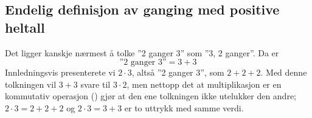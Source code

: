 \subsection*{Endelig definisjon av ganging med positive heltall}
Det ligger kanskje nærmest å tolke ''2 ganger 3'' som ''3, 2 ganger''. Da er
\[ \text{''2 ganger 3''}=3+3 \] 
Innledningsvis presenterete vi $ {2\cdot3} $, altså ''2 ganger 3'', som $ {2+2+2} $. Med denne tolkningen vil $ {3+3} $ svare til $ {3\cdot2} $, men nettopp det at multiplikasjon er en kommutativ operasjon () gjør at den ene tolkningen ikke utelukker den andre; $ {2\cdot3 =2+2+2} $ og $ {2\cdot3=3+3} $ er to uttrykk med samme verdi.\regv

 \vsk \vsk




